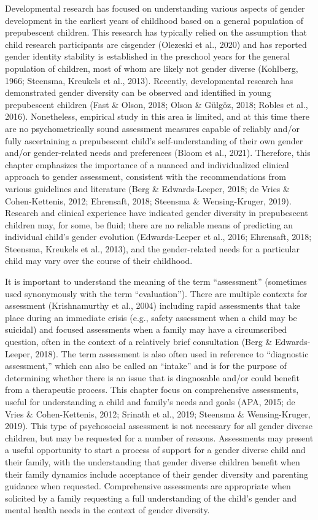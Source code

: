 \documentclass[
]{book}
\begin{document}
Developmental research has focused on understanding various aspects of gender development
in the earliest years of childhood based on a
general population of prepubescent children.
This research has typically relied on the assumption that child research participants are cisgender (Olezeski et al., 2020) and has reported
gender identity stability is established in the
preschool years for the general population of
children, most of whom are likely not gender
diverse (Kohlberg, 1966; Steensma, Kreukels
et al., 2013). Recently, developmental research
has demonstrated gender diversity can be
observed and identified in young prepubescent
children (Fast \& Olson, 2018; Olson \& Gülgöz,
2018; Robles et al., 2016). Nonetheless, empirical
study in this area is limited, and at this time
there are no psychometrically sound assessment
measures capable of reliably and/or fully ascertaining a prepubescent child's self-understanding
of their own gender and/or gender-related needs
and preferences (Bloom et al., 2021). Therefore,
this chapter emphasizes the importance of a
nuanced and individualized clinical approach to
gender assessment, consistent with the recommendations from various guidelines and literature (Berg \& Edwards-Leeper, 2018; de Vries \&
Cohen-Kettenis, 2012; Ehrensaft, 2018; Steensma
\& Wensing-Kruger, 2019). Research and clinical
experience have indicated gender diversity in
prepubescent children may, for some, be fluid;
there are no reliable means of predicting an
individual child's gender evolution
(Edwards-Leeper et al., 2016; Ehrensaft, 2018;
Steensma, Kreukels et al., 2013), and the
gender-related needs for a particular child may
vary over the course of their childhood.

It is important to understand the meaning of
the term ``assessment'' (sometimes used synonymously with the term ``evaluation''). There are
multiple contexts for assessment (Krishnamurthy
et al., 2004) including rapid assessments that
take place during an immediate crisis (e.g., safety
assessment when a child may be suicidal) and
focused assessments when a family may have a
circumscribed question, often in the context of
a relatively brief consultation (Berg \&
Edwards-Leeper, 2018). The term assessment is
also often used in reference to ``diagnostic assessment,'' which can also be called an ``intake'' and
is for the purpose of determining whether there
is an issue that is diagnosable and/or could benefit from a therapeutic process. This chapter
focus on comprehensive assessments, useful for
understanding a child and family's needs and
goals (APA, 2015; de Vries \& Cohen-Kettenis,
2012; Srinath et al., 2019; Steensma \&
Wensing-Kruger, 2019). This type of psychosocial
assessment is not necessary for all gender diverse
children, but may be requested for a number of
reasons. Assessments may present a useful
opportunity to start a process of support for a
gender diverse child and their family, with the
understanding that gender diverse children benefit when their family dynamics include
acceptance of their gender diversity and parenting guidance when requested. Comprehensive
assessments are appropriate when solicited by a
family requesting a full understanding of the
child's gender and mental health needs in the
context of gender diversity.
\end{document}
